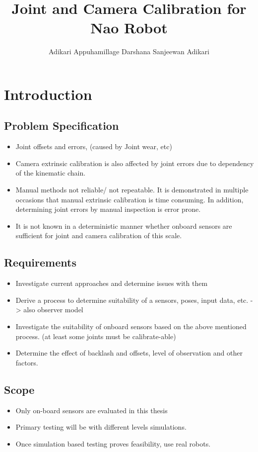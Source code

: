 \documentclass[english, printversion, nomenclature]{tuvisionthesis} %
\author{Adikari Appuhamillage Darshana Sanjeewan Adikari}
\title{Joint and Camera Calibration for Nao Robot}
\begin{document}
\chapter{Introduction}
\section{Problem Specification}
\begin{itemize}
\item Joint offsets and errors, (caused by Joint wear, etc)
\item Camera extrinsic calibration is also affected by joint errors due to dependency of the kinematic chain.
\item Manual methods not reliable/ not repeatable.
\subitem It is demonstrated in multiple occasions that manual extrinsic calibration is time consuming.
\subitem In addition, determining joint errors by manual inspection is error prone.
\item It is not known in a deterministic manner whether onboard sensors are sufficient for joint and camera calibration of this scale.
\end{itemize}

\section{Requirements}  %
\begin{itemize}
\item Investigate current approaches and determine issues with them
\item Derive a process to determine suitability of a sensors, poses, input data, etc.
-> also observer model
\item Investigate the suitability of onboard sensors based on the above mentioned process. (at least some joints must be calibrate-able)
\item Determine the effect of backlash and offsets, level of observation and other factors.
\end{itemize}

\section{Scope}  %

\begin{itemize}
\item Only on-board sensors are evaluated in this thesis

\item Primary testing will be with different levels simulations.

\item Once simulation based testing proves feasibility, use real robots.
\end{itemize}
\end{document}
